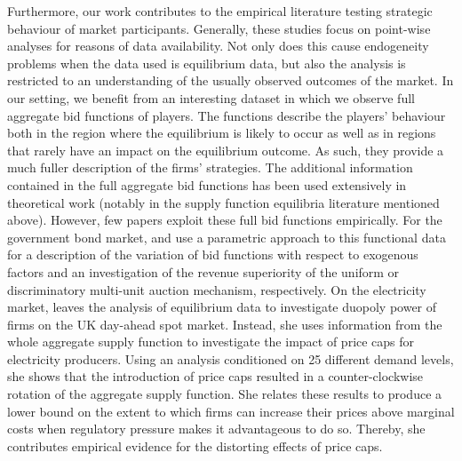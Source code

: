 Furthermore, our work contributes to the empirical literature testing strategic behaviour of market participants. 
 Generally, these studies focus on point-wise analyses for reasons of data availability. Not only does this cause endogeneity problems when the data used is equilibrium data, but also the analysis is restricted to an understanding of the usually observed outcomes of the market. 
In our setting, we benefit from an interesting dataset in which we observe full aggregate bid functions of players. The functions describe the players' behaviour both in the region where the equilibrium is likely to occur as well as in regions that  rarely have an impact on the equilibrium outcome. As such, they provide a much fuller description of the firms' strategies. 
The additional information contained in the full aggregate bid functions has been used extensively in theoretical work (notably in the supply function equilibria literature mentioned above). 
However, few papers exploit these full bid functions empirically. 
%
%
For the government bond market, \cite{pw2002etude} and \cite{ozcan2004logistic} use a parametric approach to this functional data for a description of the variation of bid functions with respect to exogenous factors and an investigation of the revenue superiority of the uniform or discriminatory multi-unit auction mechanism, respectively. On the electricity market,  \cite{wolfram1999measuring} leaves the analysis of equilibrium data to investigate duopoly power of firms on the UK day-ahead spot market. Instead, she uses information from the whole aggregate supply function to investigate the impact of price caps for electricity producers. Using an analysis conditioned on 25 different demand levels, she shows that the introduction of price caps resulted in a counter-clockwise rotation of the aggregate supply function. She relates these results to produce a lower bound on the extent to which firms can increase their prices above marginal costs when regulatory pressure makes it advantageous to do so. Thereby, she contributes  empirical evidence for the distorting effects of price caps. 


